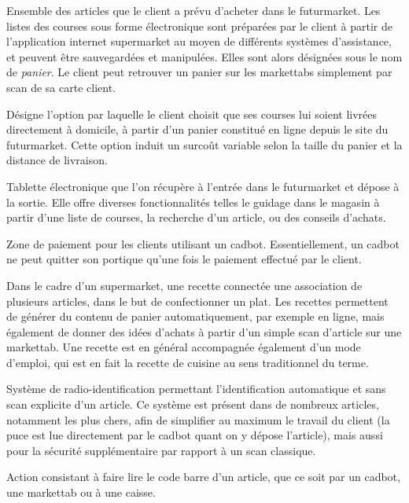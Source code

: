 Ensemble des articles que le client a prévu d'acheter dans le futurmarket.
Les listes des courses sous forme électronique sont préparées par le client à partir de l'application internet supermarket au moyen de différents systèmes d'assistance, et peuvent être sauvegardées et manipulées. 
Elles sont alors désignées sous le nom de {\em panier}.
Le client peut retrouver un panier sur les markettabs simplement par scan de sa carte client.
\par

Désigne l'option par laquelle le client choisit que ses courses lui soient livrées directement à domicile, à partir d'un panier constitué en ligne depuis le site du futurmarket.
Cette option induit un surcoût variable selon la taille du panier et la distance de livraison.
\par

Tablette électronique que l'on récupère à l'entrée dans le futurmarket et dépose à la sortie.
Elle offre diverses fonctionnalités telles le guidage dans le magasin à partir d'une liste de courses, la recherche d'un article, ou des conseils d'achats.
\par

Zone de paiement pour les clients utilisant un cadbot.
Essentiellement, un cadbot ne peut quitter son portique qu'une fois le paiement effectué par le client.
\par

Dans le cadre d'un supermarket, une recette connectée une association de plusieurs articles, dans le but de confectionner un plat. 
Les recettes permettent de générer du contenu de panier automatiquement, par exemple en ligne, mais également de donner des idées d'achats à partir d'un simple scan d'article sur une markettab.
Une recette est en général accompagnée également d'un mode d'emploi, qui est en fait la recette de cuisine au sens traditionnel du terme.
\par 

Système de radio-identification permettant l'identification automatique et sans scan explicite d'un article.
Ce système est présent dans de nombreux articles, notamment les plus chers, afin de simplifier au maximum le travail du client (la puce est lue directement par le cadbot quant on y dépose l'article), mais aussi pour la sécurité supplémentaire par rapport à un scan classique.
\par

Action consistant à faire lire le code barre d'un article, que ce soit par un cadbot, une markettab ou à une caisse.
\par
